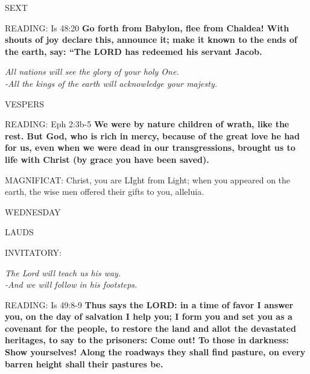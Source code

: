 \begin{flushleft}\normalsize{\uppercase{SEXT\\}}\end{flushleft}
\noindent\small{\uppercase{READING:}}   Is 48:20 \textbf{  Go forth from Babylon, flee from Chaldea! With shouts of joy declare this, announce it; make it known to the ends of the earth, say: “The LORD has redeemed his servant Jacob.}
\begin{center}\textit{All nations will see the glory of your holy One.\\
-All the kings of the earth will acknowledge your majesty.}\end{center}

\begin{flushleft}\normalsize{\uppercase{VESPERS\\}}\end{flushleft}
\noindent\small{\uppercase{READING:}}   Eph 2:3b-5 \textbf{  We were by nature children of wrath, like the rest. But God, who is rich in mercy, because of the great love he had for us, even when we were dead in our transgressions, brought us to life with Christ (by grace you have been saved).\\}

\noindent\small{\uppercase{MAGNIFICAT:}}	Christ, you are LIght from Light; when you appeared on the earth, the wise men offered their gifts to you, alleluia.\\

\begin{center}
\normalsize WEDNESDAY
\end{center}

\begin{flushleft}\normalsize{\uppercase{LAUDS\\}}\end{flushleft}
\small{\uppercase{INVITATORY:}}\normalsize
\begin{center}
\textit{The Lord will teach us his way.\\}
\textit{-And we will follow in his footsteps.\\}
\end{center}
\noindent\small{\uppercase{READING:}}   Is 49:8-9 \textbf{  Thus says the LORD: in a time of favor I answer you, on the day of salvation I help you; I form you and set you as a covenant for the people, to restore the land and allot the devastated heritages, to say to the prisoners: Come out! To those in darkness: Show yourselves! Along the roadways they shall find pasture, on every barren height shall their pastures be.\\}

